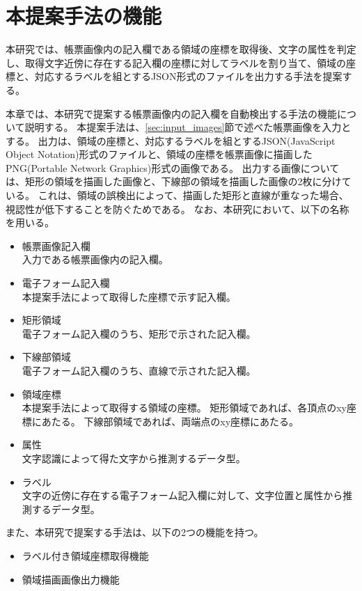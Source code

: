 \chapter{本提案手法の機能}\label{cha:Function}
本研究では、帳票画像内の記入欄である領域の座標を取得後、文字の属性を判定し、取得文字近傍に存在する記入欄の座標に対してラベルを割り当て、領域の座標と、対応するラベルを組とするJSON形式のファイルを出力する手法を提案する。

本章では、本研究で提案する帳票画像内の記入欄を自動検出する手法の機能について説明する。
本提案手法は、\ref{sec:input_images}節で述べた帳票画像を入力とする。
出力は、領域の座標と、対応するラベルを組とするJSON(JavaScript Object Notation)形式のファイルと、領域の座標を帳票画像に描画したPNG(Portable Network Graphics)形式の画像である。
出力する画像については、矩形の領域を描画した画像と、下線部の領域を描画した画像の2枚に分けている。
これは、領域の誤検出によって、描画した矩形と直線が重なった場合、視認性が低下することを防ぐためである。
なお、本研究において、以下の名称を用いる。

\begin{itemize}
    \item 帳票画像記入欄\\
          入力である帳票画像内の記入欄。
    \item 電子フォーム記入欄\\
          本提案手法によって取得した座標で示す記入欄。
    \item 矩形領域\\
          電子フォーム記入欄のうち、矩形で示された記入欄。
    \item 下線部領域\\
          電子フォーム記入欄のうち、直線で示された記入欄。
    \item 領域座標\\
          本提案手法によって取得する領域の座標。
          矩形領域であれば、各頂点のxy座標にあたる。
          下線部領域であれば、両端点のxy座標にあたる。
    \item 属性\\
          文字認識によって得た文字から推測するデータ型。
    \item ラベル\\
          文字の近傍に存在する電子フォーム記入欄に対して、文字位置と属性から推測するデータ型。
\end{itemize}

また、本研究で提案する手法は、以下の2つの機能を持つ。

\begin{itemize}
    \item ラベル付き領域座標取得機能
    \item 領域描画画像出力機能
\end{itemize}

